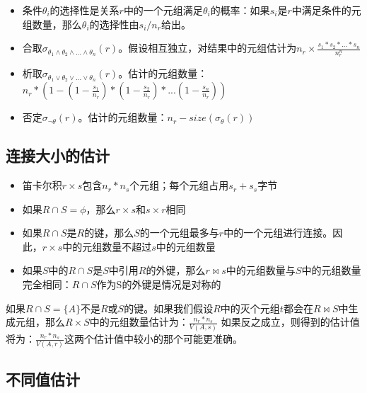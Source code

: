 \begin{itemize}
    \item 条件$\theta_i$的选择性是关系$r$中的一个元组满足$\theta_i$的概率：如果$s_i$是$r$中满足条件的元组数量，那么$\theta_i$的选择性由$s_i/n_r$给出。
    \item 合取$\sigma_{\theta_1\land\theta_2\land...\land\theta_n}(r)$。假设相互独立，对结果中的元组估计为$n_r\times \frac{s_1*s_2*...*s_n}{n_r^n}$
    \item 析取$\sigma_{\theta_1\lor\theta_2\lor...\lor\theta_n}(r)$。估计的元组数量：$n_r*\left(1-(1-\frac{s_1}{n_r})*(1-\frac{s_2}{n_r})*...(1-\frac{s_n}{n_r})\right)$
    \item 否定$\sigma_{\lnot \theta}(r)$。估计的元组数量：$n_r-size(\sigma_{\theta}(r))$
\end{itemize}

\subsection{连接大小的估计}

\begin{itemize}
    \item 笛卡尔积$r\times s$包含$n_r * n_s$个元组；每个元组占用$s_r+s_s$字节
    \item 如果$R\cap S=\phi$，那么$r\times s$和$s\times r$相同
    \item 如果$R\cap S$是$R$的键，那么$S$的一个元组最多与$r$中的一个元组进行连接。因此，$r\times s$中的元组数量不超过$s$中的元组数量 
    \item 如果$S$中的$R\cap S$是$S$中引用$R$的外键，那么$r\Join s$中的元组数量与$S$中的元组数量完全相同：$R\cap S$作为S的外键是情况是对称的
\end{itemize}

如果$R\cap S=\{A\}$不是$R$或$S$的键。如果我们假设$R$中的灭个元组$t$都会在$R\Join S$中生成元组，那么$R\times S$中的元组数量估计为：$\frac{n_r*n_s}{V(A,s)}$
如果反之成立，则得到的估计值将为：$\frac{n_r*n_s}{V(A,r)}$这两个估计值中较小的那个可能更准确。

\subsection{不同值估计}

